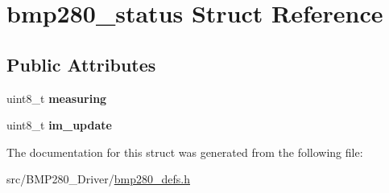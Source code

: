 \hypertarget{structbmp280__status}{}\section{bmp280\+\_\+status Struct Reference}
\label{structbmp280__status}
\subsection*{Public Attributes}
\begin{DoxyCompactItemize}
\item 
\mbox{\label{structbmp280__status_a9bcedf81723886527a69f60a27198777}} 
uint8\+\_\+t {\bfseries measuring}
\item 
\mbox{\label{structbmp280__status_a98b02b885d4749a89331886490fd8b2e}} 
uint8\+\_\+t {\bfseries im\+\_\+update}
\end{DoxyCompactItemize}


The documentation for this struct was generated from the following file\+:\begin{DoxyCompactItemize}
\item 
src/\+B\+M\+P280\+\_\+\+Driver/\mbox{\hyperlink{bmp280__defs_8h}{bmp280\+\_\+defs.\+h}}\end{DoxyCompactItemize}
